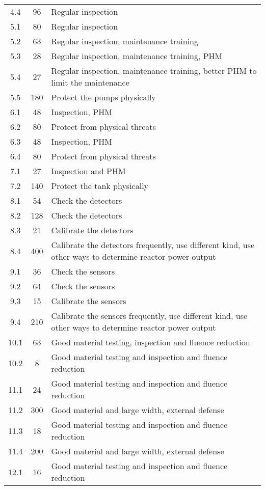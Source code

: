 \begin{longtable}{ccp{10cm}}
    4.4 & 96   & Regular inspection \\
    5.1 & 80   & Regular inspection \\
    5.2 & 63   & Regular inspection, maintenance training \\
    5.3 & 28   & Regular inspection, maintenance training, PHM \\
    5.4 & 27   & Regular inspection, maintenance training, better PHM to limit the maintenance \\
    5.5 & 180  & Protect the pumps physically \\
    6.1 & 48   & Inspection, PHM \\
    6.2 & 80   & Protect from physical threats \\
    6.3 & 48   & Inspection, PHM \\
    6.4 & 80   & Protect from physical threats \\
    7.1 & 27   & Inspection and PHM \\
    7.2 & 140  & Protect the tank physically \\
    8.1 & 54   & Check the detectors \\
    8.2 & 128  & Check the detectors \\
    8.3 & 21   & Calibrate the detectors \\
    8.4 & 400  & Calibrate the detectors frequently, use different kind, use other ways to determine reactor power output \\
    9.1 & 36   & Check the sensors \\
    9.2 & 64   & Check the sensors \\
    9.3 & 15   & Calibrate the sensors \\
    9.4 & 210  & Calibrate the sensors frequently, use different kind, use other ways to determine reactor power output \\
    10.1 & 63  & Good material testing, inspection and fluence reduction \\
    10.2 & 8   & Good material testing and inspection and fluence reduction \\
    11.1 & 24  & Good material testing and inspection and fluence reduction \\
    11.2 & 300 & Good material and large width, external defense \\
    11.3 & 18  & Good material testing and inspection and fluence reduction \\
    11.4 & 200 & Good material and large width, external defense \\
    12.1 & 16  & Good material testing and inspection and fluence reduction \\

\end{longtable}
